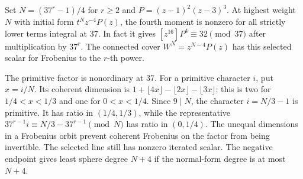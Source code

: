 \begin{example}
Set \(N=(37^r-1)/4\) for \(r\ge2\) and
\(P=(z-1)^2(z-3)^3\). At highest weight \(N\) with initial
form \(t^N z^{-4}P(z)\), the fourth moment is nonzero for all
strictly lower terms integral at 37. In fact it gives
\([z^{16}]P^4\equiv32\pmod {37}\) after multiplication by
\(37^r\). The connected cover \(W^N=z^{N-4}P(z)\) has this
selected scalar for Frobenius to the \(r\)-th power.

The primitive factor is nonordinary at 37. For a primitive
character \(i\), put \(x=i/N\). Its coherent dimension is
\(1+\lfloor4x\rfloor-\lfloor2x\rfloor-\lfloor3x\rfloor\);
this is two for \(1/4<x<1/3\) and one for \(0<x<1/4\).
Since \(9\mid N\), the character \(i=N/3-1\) is primitive.
It has ratio in \((1/4,1/3)\), while the representative
\(37^{r-1}i\equiv N/3-37^{r-1}\pmod N\) has ratio in
\((0,1/4)\). The unequal dimensions in a Frobenius orbit
prevent coherent Frobenius on the factor from being invertible.
The selected line still has nonzero iterated scalar. The
negative endpoint gives least sphere degree \(N+4\) if the
normal-form degree is at most \(N+4\).
\end{example}
